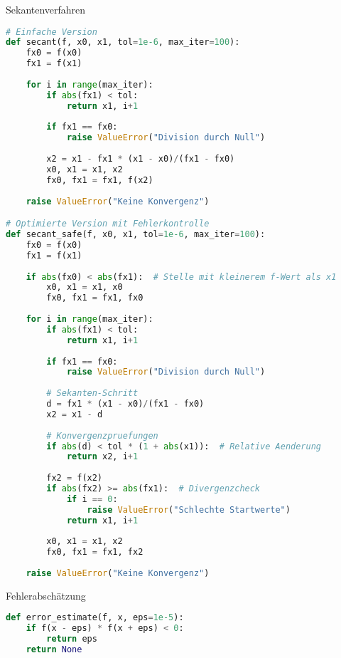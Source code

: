 \begin{examplecode}{Sekantenverfahren}
\begin{lstlisting}[language=Python, style=basesmol]
# Einfache Version
def secant(f, x0, x1, tol=1e-6, max_iter=100):
    fx0 = f(x0)
    fx1 = f(x1)
    
    for i in range(max_iter):
        if abs(fx1) < tol:
            return x1, i+1
            
        if fx1 == fx0:
            raise ValueError("Division durch Null")
            
        x2 = x1 - fx1 * (x1 - x0)/(fx1 - fx0)
        x0, x1 = x1, x2
        fx0, fx1 = fx1, f(x2)
        
    raise ValueError("Keine Konvergenz")

# Optimierte Version mit Fehlerkontrolle
def secant_safe(f, x0, x1, tol=1e-6, max_iter=100):
    fx0 = f(x0)
    fx1 = f(x1)
    
    if abs(fx0) < abs(fx1):  # Stelle mit kleinerem f-Wert als x1
        x0, x1 = x1, x0
        fx0, fx1 = fx1, fx0
    
    for i in range(max_iter):
        if abs(fx1) < tol:
            return x1, i+1
            
        if fx1 == fx0:
            raise ValueError("Division durch Null")
            
        # Sekanten-Schritt
        d = fx1 * (x1 - x0)/(fx1 - fx0)
        x2 = x1 - d
        
        # Konvergenzpruefungen
        if abs(d) < tol * (1 + abs(x1)):  # Relative Aenderung
            return x2, i+1
            
        fx2 = f(x2)
        if abs(fx2) >= abs(fx1):  # Divergenzcheck
            if i == 0:
                raise ValueError("Schlechte Startwerte")
            return x1, i+1
            
        x0, x1 = x1, x2
        fx0, fx1 = fx1, fx2
        
    raise ValueError("Keine Konvergenz")
\end{lstlisting}
\end{examplecode}

\begin{examplecode}{Fehlerabschätzung}
    \begin{lstlisting}[language=Python, style=basesmol]
def error_estimate(f, x, eps=1e-5):
    if f(x - eps) * f(x + eps) < 0:
        return eps
    return None
    \end{lstlisting}
\end{examplecode}
